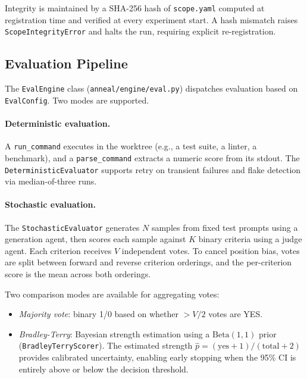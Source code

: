 Integrity is maintained by a SHA-256 hash of \texttt{scope.yaml} computed at registration time and verified at every experiment start.
A hash mismatch raises \texttt{ScopeIntegrityError} and halts the run, requiring explicit re-registration.

\subsection{Evaluation Pipeline}\label{sec:eval-pipeline}

The \texttt{EvalEngine} class (\texttt{anneal/engine/eval.py}) dispatches evaluation based on \texttt{EvalConfig}.
Two modes are supported.

\paragraph{Deterministic evaluation.}
A \texttt{run\_command} executes in the worktree (e.g., a test suite, a linter, a benchmark), and a \texttt{parse\_command} extracts a numeric score from its stdout.
The \texttt{DeterministicEvaluator} supports retry on transient failures and flake detection via median-of-three runs.

\paragraph{Stochastic evaluation.}
The \texttt{StochasticEvaluator} generates $N$ samples from fixed test prompts using a generation agent, then scores each sample against $K$ binary criteria using a judge agent.
Each criterion receives $V$ independent votes.
To cancel position bias, votes are split between forward and reverse criterion orderings, and the per-criterion score is the mean across both orderings.

Two comparison modes are available for aggregating votes:
\begin{itemize}
    \item \emph{Majority vote}: binary 1/0 based on whether $> V/2$ votes are YES.
    \item \emph{Bradley-Terry}: Bayesian strength estimation using a $\text{Beta}(1,1)$ prior (\texttt{Bradley\allowbreak{}Terry\allowbreak{}Scorer}). The estimated strength $\hat{p} = (\text{yes} + 1) / (\text{total} + 2)$ provides calibrated uncertainty, enabling early stopping when the 95\% CI is entirely above or below the decision threshold.
\end{itemize}

